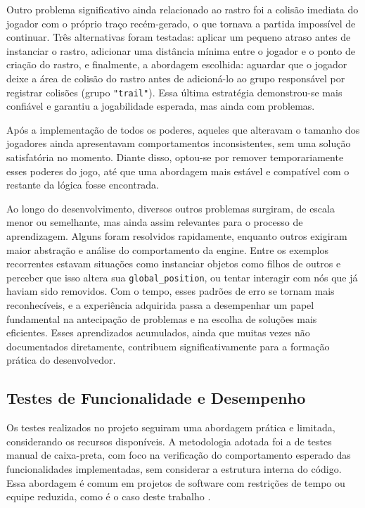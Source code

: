 Outro problema significativo ainda relacionado ao rastro foi a colisão imediata do jogador com o próprio traço recém-gerado, o que tornava a partida impossível de continuar. Três alternativas foram testadas: aplicar um pequeno atraso antes de instanciar o rastro, adicionar uma distância mínima entre o jogador e o ponto de criação do rastro, e finalmente, a abordagem escolhida: aguardar que o jogador deixe a área de colisão do rastro antes de adicioná-lo ao grupo responsável por registrar colisões (grupo \texttt{"trail"}). Essa última estratégia demonstrou-se mais confiável e garantiu a jogabilidade esperada, mas ainda com problemas.

Após a implementação de todos os poderes, aqueles que alteravam o tamanho dos jogadores ainda apresentavam comportamentos inconsistentes, sem uma solução satisfatória no momento. Diante disso, optou-se por remover temporariamente esses poderes do jogo, até que uma abordagem mais estável e compatível com o restante da lógica fosse encontrada.

Ao longo do desenvolvimento, diversos outros problemas surgiram, de escala menor ou semelhante, mas ainda assim relevantes para o processo de aprendizagem. Alguns foram resolvidos rapidamente, enquanto outros exigiram maior abstração e análise do comportamento da engine. Entre os exemplos recorrentes estavam situações como instanciar objetos como filhos de outros e perceber que isso altera sua \texttt{global\_position}, ou tentar interagir com nós que já haviam sido removidos. Com o tempo, esses padrões de erro se tornam mais reconhecíveis, e a experiência adquirida passa a desempenhar um papel fundamental na antecipação de problemas e na escolha de soluções mais eficientes. Esses aprendizados acumulados, ainda que muitas vezes não documentados diretamente, contribuem significativamente para a formação prática do desenvolvedor.

\subsection{Testes de Funcionalidade e Desempenho}

Os testes realizados no projeto seguiram uma abordagem prática e limitada, considerando os recursos disponíveis. A metodologia adotada foi a de testes manual de caixa-preta, com foco na verificação do comportamento esperado das funcionalidades implementadas, sem considerar a estrutura interna do código. Essa abordagem é comum em projetos de software com restrições de tempo ou equipe reduzida, como é o caso deste trabalho \cite{pinheiro2024testes} \cite{checkpoint_blackbox}.

